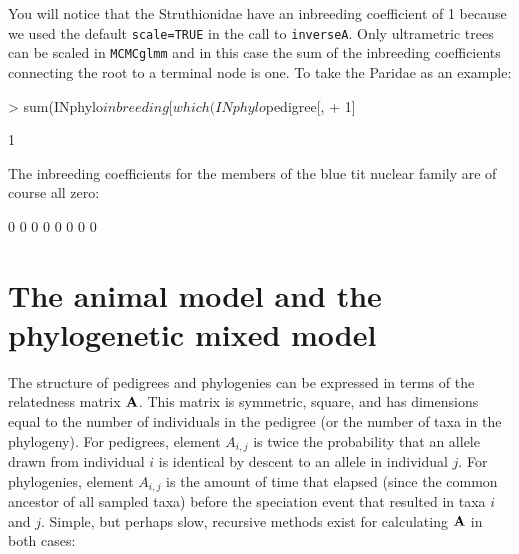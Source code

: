 \documentclass{article}
\begin{document}
You will notice that the Struthionidae have an inbreeding coefficient of 1 because we used the default \texttt{scale=TRUE} in the call to \texttt{inverseA}.  Only ultrametric trees can be scaled in \texttt{MCMCglmm} and in this case the sum of the inbreeding coefficients connecting the root to a terminal node is one. To take the Paridae as an example:

\begin{Schunk}
\begin{Sinput}
> sum(INphylo$inbreeding[which(INphylo$pedigree[, 
+     1] %
\end{Sinput}
\begin{Soutput}
[1] 1
\end{Soutput}
\end{Schunk}

The inbreeding coefficients for the members of the blue tit nuclear family are of course all zero:

\begin{Schunk}
\begin{Soutput}
[1] 0 0 0 0 0 0 0 0
\end{Soutput}
\end{Schunk}

\section{The animal model and the phylogenetic mixed model}

The structure of pedigrees and phylogenies can be expressed in terms of the relatedness matrix  ${\bf A}$. This matrix is symmetric, square, and has dimensions equal to the number of individuals in the pedigree (or the number of taxa in the phylogeny). For pedigrees, element $A_{i,j}$ is twice the probability that an allele drawn from individual $i$ is identical by descent to an allele in individual $j$.  For phylogenies, element $A_{i,j}$ is the amount of time that elapsed (since the common ancestor of all sampled taxa) before the speciation event that resulted in taxa $i$ and $j$. Simple, but perhaps slow, recursive methods exist for calculating  ${\bf A}$ in both cases:
\end{document}
